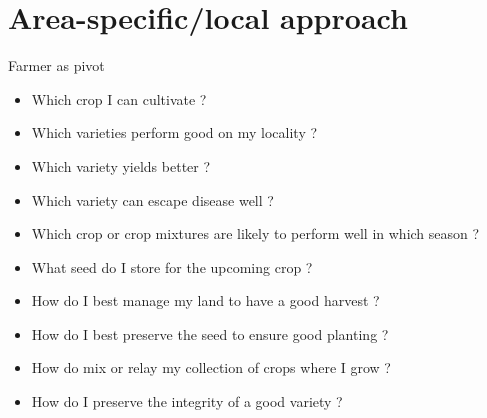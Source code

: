 \documentclass[ignorenonframetext,aspectratio=169]{beamer}
\providecommand{\tightlist}{%
  \setlength{\itemsep}{0pt}\setlength{\parskip}{0pt}}
\begin{document}
\hypertarget{area-specificlocal-approach}{%
\section{Area-specific/local
approach}\label{area-specificlocal-approach}}

\begin{frame}{Farmer as pivot}
\protect\hypertarget{farmer-as-pivot}{}

\begin{itemize}
\tightlist
\item
  Which crop I can cultivate ?
\item
  Which varieties perform good on my locality ?
\item
  Which variety yields better ?
\item
  Which variety can escape disease well ?
\item
  Which crop or crop mixtures are likely to perform well in which season
  ?
\item
  What seed do I store for the upcoming crop ?
\item
  How do I best manage my land to have a good harvest ?
\item
  How do I best preserve the seed to ensure good planting ?
\item
  How do mix or relay my collection of crops where I grow ?
\item
  How do I preserve the integrity of a good variety ?
\end{itemize}

\end{frame}
\end{document}
